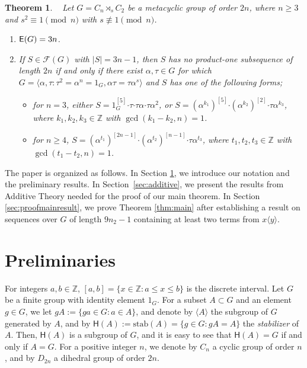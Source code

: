 \documentclass[leqno,a4paper]{amsart}
\def\E{{\sf E}}
\def\F{{\mathcal F}}
\def\bd{{\boldsymbol{\cdot}}}
\def\stab{\text{stab}}
\def\Z{\mathbb Z}
\theoremstyle{plain}
\newtheorem{theorem}{Theorem}[section]
\theoremstyle{definition}
\numberwithin{equation}{section}
\begin{document}
		
		\smallskip
		\begin{theorem} \label{thm:except}~
		Let  $G = C_n \rtimes_s C_2$ be a  metacyclic group of order $2n$, where $n\ge 3$ and  $s^{2} \equiv 1 \pmod{n}$ with $s\not\equiv 1 \pmod n$.
			\begin{enumerate}
			\item $\E(G) = 3n$.
		
			\smallskip
			\item If $S \in \F(G)$ with $|S| = 3n-1$, then $S$ has no product-one subsequence of length $2n$ if and only if there exist $\alpha, \tau \in G$ for which $G = \langle \alpha, \tau \colon \tau^2 = \alpha^n = 1_G, \alpha \tau = \tau \alpha^s \rangle$ and $S$ has one of the following forms;
				\begin{itemize}
				\item for $n = 3$, either $S = 1^{[5]}_G \bd \tau \bd \tau \alpha \bd \tau \alpha^2$, or $S = (\alpha^{k_1})^{[5]} \bd (\alpha^{k_2})^{[2]} \bd \tau \alpha^{k_3}$, where $k_1, k_2, k_3 \in \mathbb Z$ with $\gcd (k_1 - k_2, n) = 1$.
			
				\smallskip
				\item for $n \ge 4$, $S = (\alpha^{t_1})^{[2n-1]} \bd (\alpha^{t_2})^{[n-1]} \bd \tau \alpha^{t_3}$, where $t_1, t_2, t_3 \in \Z$ with $\gcd(t_1-t_2,n) = 1$.
				\end{itemize}
			\end{enumerate}
		\end{theorem}
		
		
		
		
		\smallskip
		The paper is organized as follows. In Section \ref{sec:defnotlemmas}, we introduce our notation and the preliminary results. In Section~\ref{sec:additive}, we present the results from Additive Theory needed for the proof of our main theorem.
        In Section \ref{sec:proofmainresult}, we prove Theorem \ref{thm:main} after establishing a result on sequences over $G$ of length $9n_2-1$ containing at least two terms from $x \langle y \rangle$.

	
	
		
	\bigskip
	\section{Preliminaries}\label{sec:defnotlemmas}

	
	For integers $a, b \in \mathbb Z$, $[a, b] = \{ x \in \mathbb Z \colon a \le x \le b \}$ is the discrete interval.
	Let $G$ be a finite group with identity element $1_G$.
	For a subset $A \subset G$ and an element $g \in G$, we let $gA := \{ ga \in G \colon a \in A \}$, and  denote by $\langle A \rangle$ the subgroup of $G$ generated by $A$, and by $\mathsf H (A) := \stab (A) = \{ g \in G \colon gA = A \}$ the {\it stabilizer} of $A$. Then, $\mathsf H (A)$ is a subgroup of $G$, and it is easy to see that $\mathsf H (A) = G$ if and only if $A = G$.
	For a positive  integer $n$, we denote by $C_n$ a cyclic group of order $n$, and by $D_{2n}$ a dihedral group of order $2n$.
	
\end{document}
